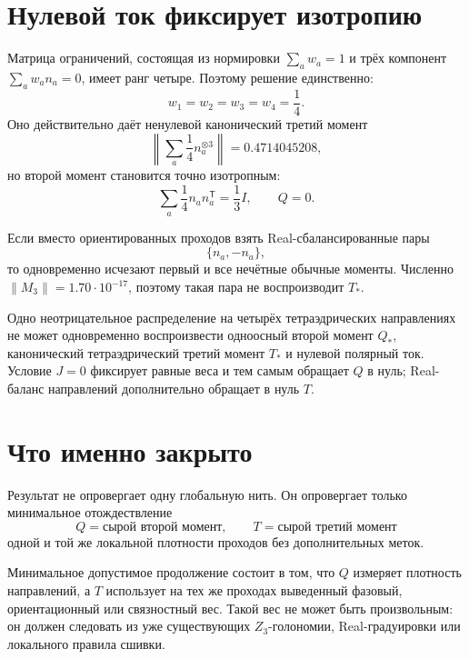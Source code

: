 \section{Нулевой ток фиксирует изотропию}

Матрица ограничений, состоящая из нормировки
$\sum_a w_a=1$ и трёх компонент $\sum_aw_an_a=0$, имеет ранг четыре.
Поэтому решение единственно:
\begin{equation}
 w_1=w_2=w_3=w_4=\frac14.
\end{equation}
Оно действительно даёт ненулевой канонический третий момент
\begin{equation}
 \left\|\sum_a\frac14n_a^{\otimes3}\right\|
 =0.4714045208,
\end{equation}
но второй момент становится точно изотропным:
\begin{equation}
 \sum_a\frac14 n_an_a^{\mathsf T}=\frac13I,
 \qquad Q=0.
\end{equation}

Если вместо ориентированных проходов взять Real-сбалансированные пары
\begin{equation}
 \{n_a,-n_a\},
\end{equation}
то одновременно исчезают первый и все нечётные обычные моменты. Численно
$\|M_3\|=1.70\cdot10^{-17}$, поэтому такая пара не воспроизводит $T_*$.

\begin{theorem}
Одно неотрицательное распределение на четырёх тетраэдрических направлениях
не может одновременно воспроизвести одноосный второй момент $Q_*$,
канонический тетраэдрический третий момент $T_*$ и нулевой полярный ток.
Условие $J=0$ фиксирует равные веса и тем самым обращает $Q$ в нуль;
Real-баланс направлений дополнительно обращает в нуль $T$.
\end{theorem}

\section{Что именно закрыто}

Результат не опровергает одну глобальную нить. Он опровергает только
минимальное отождествление
\begin{equation}
 Q=\text{сырой второй момент},
 \qquad
 T=\text{сырой третий момент}
\end{equation}
одной и той же локальной плотности проходов без дополнительных меток.

Минимальное допустимое продолжение состоит в том, что $Q$ измеряет
плотность направлений, а $T$ использует на тех же проходах выведенный
фазовый, ориентационный или связностный вес. Такой вес не может быть
произвольным: он должен следовать из уже существующих $Z_3$-голономии,
Real-градуировки или локального правила сшивки.

